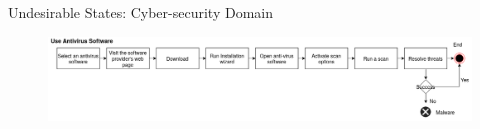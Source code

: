 \begin{frame}{Undesirable States: Cyber-security Domain}

\begin{figure}[ht]
  \centering
\includegraphics[width=1.05\columnwidth]{img/Tasks2.png}
\end{figure}

\end{frame}
